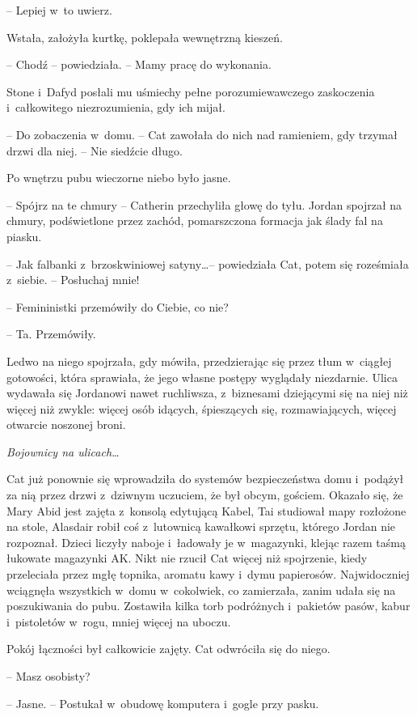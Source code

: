 \documentclass[oneside,polish,11pt,sfheadings]{mwbk}
\begin{document}
-- Lepiej w~to uwierz.

Wstała, założyła kurtkę, poklepała wewnętrzną kieszeń. 

-- Chodź -- powiedziała. -- Mamy pracę do wykonania.

Stone i~Dafyd posłali mu uśmiechy pełne porozumiewawczego zaskoczenia i~całkowitego niezrozumienia, gdy ich mijał.

-- Do zobaczenia w~domu. -- Cat zawołała do nich nad ramieniem, gdy
trzymał drzwi dla niej. -- Nie siedźcie długo.

Po wnętrzu pubu wieczorne niebo było jasne.

-- Spójrz na te chmury -- Catherin przechyliła głowę do tyłu. Jordan
spojrzał na chmury, podświetlone przez zachód, pomarszczona formacja jak
ślady fal na piasku.

-- Jak falbanki z~brzoskwiniowej satyny\ldots -- powiedziała Cat, potem się
roześmiała z~siebie. -- Posłuchaj mnie!

-- Femininistki przemówiły do Ciebie, co nie?

-- Ta. Przemówiły.

Ledwo na niego spojrzała, gdy mówiła, przedzierając się przez tłum w~ciągłej gotowości, która sprawiała, że jego własne postępy wyglądały
niezdarnie. Ulica wydawała się Jordanowi nawet ruchliwsza, z~biznesami
dziejącymi się na niej niż więcej niż zwykle: więcej osób idących,
śpieszących się, rozmawiających, więcej otwarcie noszonej broni.

\emph{Bojownicy na ulicach\ldots}

Cat już ponownie się wprowadziła do systemów bezpieczeństwa domu i~podążył za nią przez drzwi z~dziwnym uczuciem, że był obcym, gościem.
Okazało się, że Mary Abid jest zajęta z~konsolą edytującą Kabel, Tai
studiował mapy rozłożone na stole, Alasdair robił coś z~lutownicą
kawałkowi sprzętu, którego Jordan nie rozpoznał. Dzieci liczyły naboje i~ładowały je w~magazynki, klejąc razem taśmą łukowate magazynki AK. Nikt
nie rzucił Cat więcej niż spojrzenie, kiedy przeleciała przez mgłę
topnika, aromatu kawy i~dymu papierosów. Najwidoczniej wciągnęła
wszystkich w~domu w~cokolwiek, co zamierzała, zanim udała się na
poszukiwania do pubu. Zostawiła kilka torb podróżnych i~pakietów pasów,
kabur i~pistoletów w~rogu, mniej więcej na uboczu.

Pokój łączności był całkowicie zajęty. Cat odwróciła się do niego.

-- Masz osobisty?

-- Jasne. -- Postukał w~obudowę komputera i~gogle przy pasku.
\end{document}
